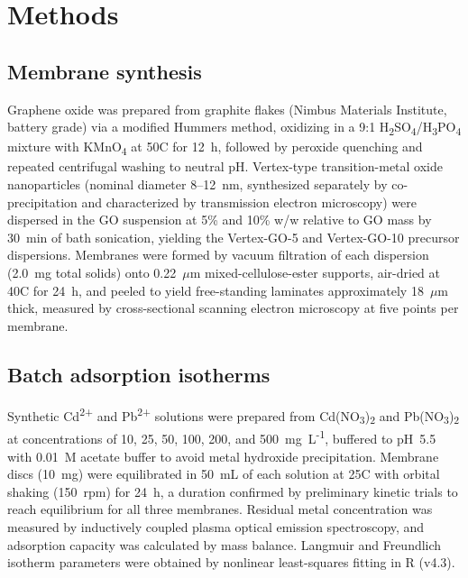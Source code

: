 \section{Methods}

\subsection{Membrane synthesis}

Graphene oxide was prepared from graphite flakes (Nimbus Materials Institute, battery grade) via a modified Hummers method, oxidizing in a 9:1 H\textsubscript{2}SO\textsubscript{4}/H\textsubscript{3}PO\textsubscript{4} mixture with KMnO\textsubscript{4} at 50\textdegree C for 12~h, followed by peroxide quenching and repeated centrifugal washing to neutral pH. Vertex-type transition-metal oxide nanoparticles (nominal diameter 8--12~nm, synthesized separately by co-precipitation and characterized by transmission electron microscopy) were dispersed in the GO suspension at 5\% and 10\% w/w relative to GO mass by 30~min of bath sonication, yielding the Vertex-GO-5 and Vertex-GO-10 precursor dispersions. Membranes were formed by vacuum filtration of each dispersion (2.0~mg total solids) onto 0.22~$\mu$m mixed-cellulose-ester supports, air-dried at 40\textdegree C for 24~h, and peeled to yield free-standing laminates approximately 18~$\mu$m thick, measured by cross-sectional scanning electron microscopy at five points per membrane.

\subsection{Batch adsorption isotherms}

Synthetic Cd\textsuperscript{2+} and Pb\textsuperscript{2+} solutions were prepared from Cd(NO\textsubscript{3})\textsubscript{2} and Pb(NO\textsubscript{3})\textsubscript{2} at concentrations of 10, 25, 50, 100, 200, and 500~mg~L\textsuperscript{-1}, buffered to pH~5.5 with 0.01~M acetate buffer to avoid metal hydroxide precipitation. Membrane discs (10~mg) were equilibrated in 50~mL of each solution at 25\textdegree C with orbital shaking (150~rpm) for 24~h, a duration confirmed by preliminary kinetic trials to reach equilibrium for all three membranes. Residual metal concentration was measured by inductively coupled plasma optical emission spectroscopy, and adsorption capacity was calculated by mass balance. Langmuir and Freundlich isotherm parameters were obtained by nonlinear least-squares fitting in R (v4.3).

